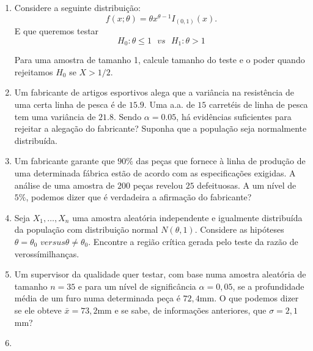 \documentclass[12pt,a4paper]{article}
\begin{document}
\begin{enumerate}[label=\textbf{\arabic*)}]
\item Considere a seguinte distribuição: $$f(x;\theta) = \theta x^{\theta-1}I_{(0,1)}(x).$$ E que queremos testar $$H_0: \theta \leq 1\, \, \, \, vs \, \, \, \, H_1: \theta > 1$$

Para uma amostra de tamanho 1, calcule tamanho do teste e o poder quando rejeitamos $H_0$ se $X > 1/2$.

\item Um fabricante de artigos esportivos alega que a variância na resistência de uma certa linha de pesca é de $15.9$. Uma a.a. de $15$ carretéis de linha de pesca tem uma variância de $21.8$. Sendo $\alpha = 0.05$, há evidências suficientes para rejeitar a alegação do fabricante? Suponha que a população seja normalmente distribuída.

\item Um fabricante garante que $ 90\% $ das peças que fornece à linha de produção de uma determinada fábrica estão de acordo com as especificações exigidas. A análise de uma amostra de $ 200 $ peças revelou $ 25 $ defeituosas. A um nível de $ 5\% $, podemos dizer que é verdadeira a afirmação do fabricante?

\item Seja $ X_1,\ldots,X_n $ uma amostra aleatória independente e igualmente distribuída da população com distribuição normal $ N(\theta,1) $. Considere as hipóteses $\theta = \theta_0$ $ versus \theta\neq\theta_0 $. Encontre a região crítica gerada pelo teste da razão de verossímilhanças.

\item Um supervisor da qualidade quer testar, com base numa amostra aleatória de tamanho $ n = 35 $ e para um nível de significância $ \alpha = 0,05 $, se a profundidade média de um furo numa determinada peça é $ 72,4 $mm. O que podemos dizer se ele obteve $ \bar{x} = 73,2 $mm e se sabe, de informações anteriores, que $ \sigma = 2,1 $mm?

\item 

\end{enumerate}
\end{document}
